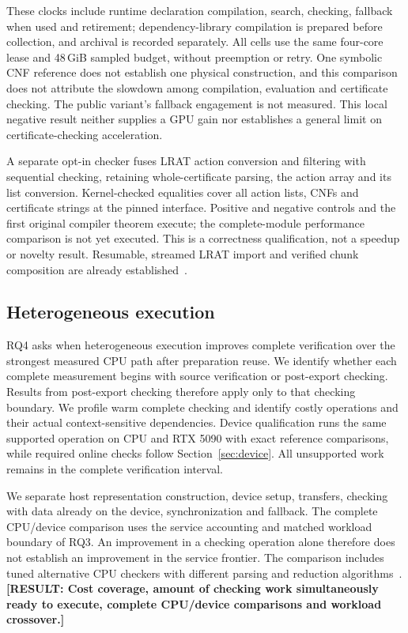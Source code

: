\documentclass[10pt,twocolumn]{article}
\newcommand{\missing}[1]{\textbf{[RESULT: #1]}}
\begin{document}
These clocks include runtime declaration compilation, search, checking,
fallback when used and retirement; dependency-library compilation is prepared
before collection, and archival is recorded separately. All cells use the
same four-core lease and 48\,GiB sampled budget, without preemption or retry.
One symbolic CNF reference does not establish one physical construction,
and this comparison does not attribute the slowdown among compilation,
evaluation and certificate checking. The public variant's fallback engagement
is not measured. This local negative result neither supplies a GPU gain nor
establishes a general limit on certificate-checking acceleration.

A separate opt-in checker fuses LRAT action conversion and filtering with
sequential checking, retaining whole-certificate parsing, the action array
and its list conversion. Kernel-checked equalities cover all action lists,
CNFs and certificate strings at the pinned interface. Positive and negative
controls and the first original compiler theorem execute; the complete-module
performance comparison is not yet executed. This is a correctness qualification,
not a speedup or novelty result. Resumable, streamed LRAT import and verified
chunk composition are already established~\cite{lratStreaming}.

\subsection{Heterogeneous execution}
RQ4 asks when heterogeneous execution improves complete verification over the strongest measured CPU path after preparation reuse. We identify whether each complete measurement begins with source verification or post-export checking. Results from post-export checking therefore apply only to that checking boundary. We profile warm complete checking and identify costly operations and their actual context-sensitive dependencies. Device qualification runs the same supported operation on CPU and RTX 5090 with exact reference comparisons, while required online checks follow Section~\ref{sec:device}. All unsupported work remains in the complete verification interval.

We separate host representation construction, device setup, transfers, checking with data already on the device, synchronization and fallback. The complete CPU/device comparison uses the service accounting and matched workload boundary of RQ3. An improvement in a checking operation alone therefore does not establish an improvement in the service frontier. The comparison includes tuned alternative CPU checkers with different parsing and reduction algorithms~\cite{nanoclo,nanocloFortran}. \missing{Cost coverage, amount of checking work simultaneously ready to execute, complete CPU/device comparisons and workload crossover.}
\end{document}
